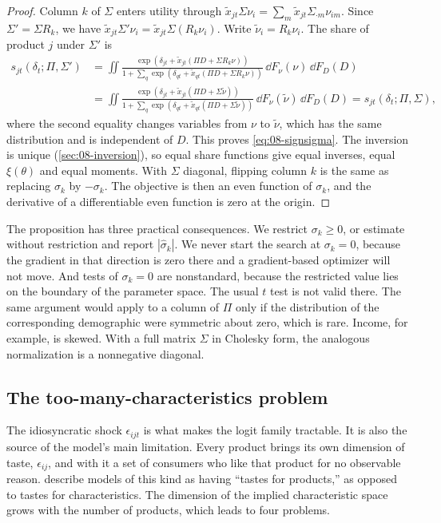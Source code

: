 \begin{proof}
Column $k$ of $\Sigma$ enters utility through $\tilde x_{jt}\Sigma\nu_i = \sum_m \tilde x_{jt}\Sigma_{\cdot m}\nu_{im}$.
Since $\Sigma' = \Sigma R_k$, we have $\tilde x_{jt}\Sigma'\nu_i = \tilde x_{jt}\Sigma(R_k\nu_i)$. Write
$\tilde\nu_i = R_k\nu_i$. The share of product $j$ under $\Sigma'$ is
\begin{align*}
  s_{jt}(\delta_t; \Pi, \Sigma') &= \iint \frac{\exp(\delta_{jt} + \tilde x_{jt}(\Pi D + \Sigma R_k\nu))}{1 + \sum_q
  \exp(\delta_{qt} + \tilde x_{qt}(\Pi D + \Sigma R_k\nu))}\,\dd F_\nu(\nu)\,\dd F_D(D) \\
  &= \iint \frac{\exp(\delta_{jt} + \tilde x_{jt}(\Pi D + \Sigma \tilde\nu))}{1 + \sum_q
  \exp(\delta_{qt} + \tilde x_{qt}(\Pi D + \Sigma \tilde\nu))}\,\dd F_\nu(\tilde\nu)\,\dd F_D(D)
  = s_{jt}(\delta_t; \Pi, \Sigma),
\end{align*}
where the second equality changes variables from $\nu$ to $\tilde\nu$, which has the same distribution and is
independent of $D$. This proves \eqref{eq:08-signsigma}. The inversion is unique (\cref{sec:08-inversion}), so equal
share functions give equal inverses, equal $\xi(\theta)$ and equal moments. With $\Sigma$ diagonal, flipping column $k$
is the same as replacing $\sigma_k$ by $-\sigma_k$. The objective is then an even function of $\sigma_k$, and the
derivative of a differentiable even function is zero at the origin.
\end{proof}

The proposition has three practical consequences. We restrict $\sigma_k \geq 0$, or estimate without restriction and
report $|\hat\sigma_k|$. We never start the search at $\sigma_k = 0$, because the gradient in that direction is zero
there and a gradient-based optimizer will not move. And tests of $\sigma_k = 0$ are nonstandard, because the
restricted value lies on the boundary of the parameter space. The usual $t$ test is not valid there. The same argument
would apply to a column of $\Pi$ only if the distribution of the corresponding demographic were symmetric about zero,
which is rare. Income, for example, is skewed. With a full
matrix $\Sigma$ in Cholesky form, the analogous normalization is a nonnegative diagonal.

\subsection{The too-many-characteristics problem}\label{sec:08-toomany}

The idiosyncratic shock $\epsilon_{ijt}$ is what makes the logit family tractable. It is also the source of the model's
main limitation. Every product brings its own dimension of taste, $\epsilon_{ij}$, and with it a set of consumers who
like that product for no observable reason. \citet[Section~2]{BerryPakes2007} describe models of this kind as having
``tastes for products,'' as opposed to tastes for characteristics. The dimension of the implied characteristic space
grows with the number of products, which leads to four problems.

